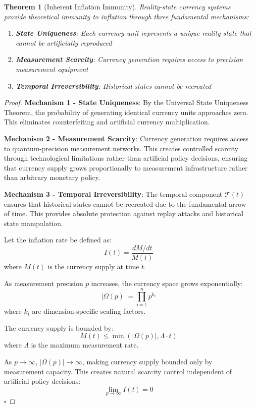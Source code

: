 \documentclass[12pt,a4paper]{article}
\newtheorem{theorem}{Theorem}
\begin{document}
\begin{theorem}[Inherent Inflation Immunity]
Reality-state currency systems provide theoretical immunity to inflation through three fundamental mechanisms:
\begin{enumerate}
\item \textbf{State Uniqueness}: Each currency unit represents a unique reality state that cannot be artificially reproduced
\item \textbf{Measurement Scarcity}: Currency generation requires access to precision measurement equipment
\item \textbf{Temporal Irreversibility}: Historical states cannot be recreated
\end{enumerate}
\end{theorem}

\begin{proof}
\textbf{Mechanism 1 - State Uniqueness}: By the Universal State Uniqueness Theorem, the probability of generating identical currency units approaches zero. This eliminates counterfeiting and artificial currency multiplication.

\textbf{Mechanism 2 - Measurement Scarcity}: Currency generation requires access to quantum-precision measurement networks. This creates controlled scarcity through technological limitations rather than artificial policy decisions, ensuring that currency supply grows proportionally to measurement infrastructure rather than arbitrary monetary policy.

\textbf{Mechanism 3 - Temporal Irreversibility}: The temporal component $\mathcal{T}(t)$ ensures that historical states cannot be recreated due to the fundamental arrow of time. This provides absolute protection against replay attacks and historical state manipulation.

Let the inflation rate be defined as:
\begin{equation}
I(t) = \frac{dM/dt}{M(t)}
\end{equation}
where $M(t)$ is the currency supply at time $t$.

As measurement precision $p$ increases, the currency space grows exponentially:
\begin{equation}
|\Omega(p)| = \prod_{i=1}^{n} p^{k_i}
\end{equation}
where $k_i$ are dimension-specific scaling factors.

The currency supply is bounded by:
\begin{equation}
M(t) \leq \min(|\Omega(p)|, \Lambda \cdot t)
\end{equation}
where $\Lambda$ is the maximum measurement rate.

As $p \to \infty$, $|\Omega(p)| \to \infty$, making currency supply bounded only by measurement capacity. This creates natural scarcity control independent of artificial policy decisions:
\begin{equation}
\lim_{p \to \infty} I(t) = 0
\end{equation}
$\square$
\end{proof}
\end{document}
